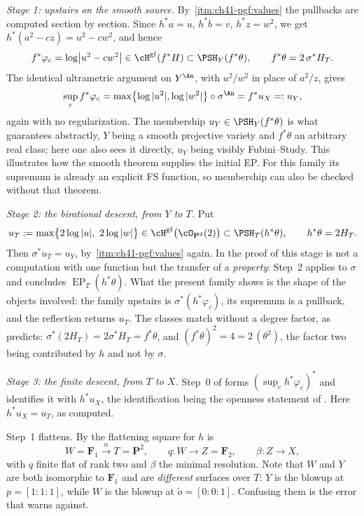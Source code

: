 \begin{example}
\emph{Stage 1: upstairs on the smooth source.}
By \,\cref{itm:ch41-pgf:values} the
pullbacks are computed section by section.  Since $h^*a=u$, $h^*b=v$,
$h^*z=w^2$, we get $h^*(a^2-cz)=u^2-cw^2$, and hence
\[
 f^*\varphi_c=\log\bigl|u^2-cw^2\bigr|
 \in\cH^{\mathrm{gf}}(f^*H)\subset\PSH_Y(f^*\theta),
 \qquad f^*\theta=2\,\sigma^*H_T .
\]
The identical ultrametric argument on $Y^{\An}$, with $u^2/w^2$ in place
of $a^2/z$, gives
\[
 \sup_{c}f^*\varphi_c
 =\max\bigl\{\log|u^2|,\log|w^2|\bigr\}\circ\sigma^{\An}
 =f^*u_X=:u_Y ,
\]
again with no regularization.  The membership $u_Y\in\PSH_Y(f^*\theta)$ is
what  guarantees abstractly, $Y$ being a
smooth projective variety and $f^*\theta$ an arbitrary real class; here one
also sees it directly, $u_Y$ being visibly Fubini--Study.  This illustrates how the smooth theorem supplies the initial EP.
For this family its supremum is already an explicit FS function,
so membership can also be checked without that theorem.

\emph{Stage 2: the birational descent, from $Y$ to $T$.}
Put
\[
 u_T:=\max\bigl\{2\log|u|,\ 2\log|w|\bigr\}
 \in\cH^{\mathrm{gf}}\bigl(\cO_{\mathbf P^2}(2)\bigr)
 \subset\PSH_T(h^*\theta),
 \qquad h^*\theta=2H_T .
\]
Then $\sigma^*u_T=u_Y$, by
\,\cref{itm:ch41-pgf:values} again.  In the
proof of  this stage is not a computation
with one function but the transfer of a \emph{property}: Step~2 applies
 to $\sigma$ and concludes
$\operatorname{EP}_T(h^*\theta)$.  What the present family shows is the
shape of the objects involved: the family upstairs is
$\sigma^*(h^*\varphi_c)$, its supremum is a pullback, and the reflection
returns $u_T$.  The classes match without a degree factor, as
 predicts:
$\sigma^*(2H_T)=2\sigma^*H_T=f^*\theta$, and
$(f^*\theta)^2=4=2\,(\theta^2)$, the factor two being contributed by
$h$ and not by $\sigma$.

\emph{Stage 3: the finite descent, from $T$ to $X$.}
Step~0 of  forms
$(\sup_ch^*\varphi_c)^*$ and identifies it with $h^*u_X$, the
identification being the openness statement of
.  Here $h^*u_X=u_T$, as computed.

Step~1 flattens.  By  the flattening square for $h$ is
\[
 W=\mathbf F_1\xrightarrow{\ \alpha\ }T=\mathbf P^2,
 \qquad
 q:W\to Z=\mathbf F_2,
 \qquad
 \beta:Z\to X,
\]
with $q$ finite flat of rank two and $\beta$ the minimal resolution.
Note that $W$ and $Y$ are both isomorphic to $\mathbf F_1$ and are
\emph{different} surfaces over $T$: $Y$ is the blowup at
$p=[1:1:1]$, while $W$ is the blowup at $\tilde o=[0:0:1]$.  Confusing
them is the error that  warns against.


\end{example}
